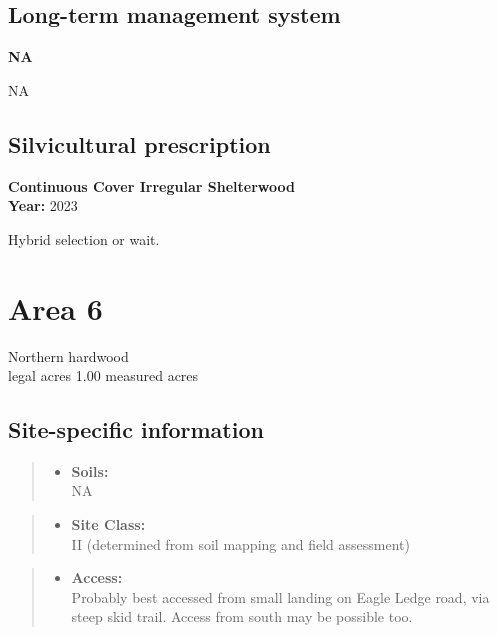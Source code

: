 \documentclass[]{tufte-handout}
\providecommand{\tightlist}{%
  \setlength{\itemsep}{0pt}\setlength{\parskip}{0pt}}
\begin{document}
\subsection{Long-term management
system}\label{long-term-management-system-4}

\textbf{NA}

NA

\subsection{Silvicultural
prescription}\label{silvicultural-prescription-4}

\textbf{Continuous Cover Irregular Shelterwood}\\
\noindent \textbf{Year:} 2023

Hybrid selection or wait.

\newpage

\section{Area 6}\label{area-6}

Northern hardwood\\
 legal acres \textbar{} 1.00 measured acres

\subsection{Site-specific
information}\label{site-specific-information-5}

\begin{quote}
\begin{itemize}
\tightlist
\item
  \textbf{Soils:}\\
  \indent\indent  NA
\end{itemize}
\end{quote}

\begin{quote}
\begin{itemize}
\tightlist
\item
  \textbf{Site Class:}\\
  \vspace{2pt} II (determined from soil mapping and field assessment)
\end{itemize}
\end{quote}

\begin{quote}
\begin{itemize}
\tightlist
\item
  \textbf{Access:}\\
  \vspace{2pt} Probably best accessed from small landing on Eagle Ledge
  road, via steep skid trail. Access from south may be possible too.
\end{itemize}
\end{quote}
\end{document}
